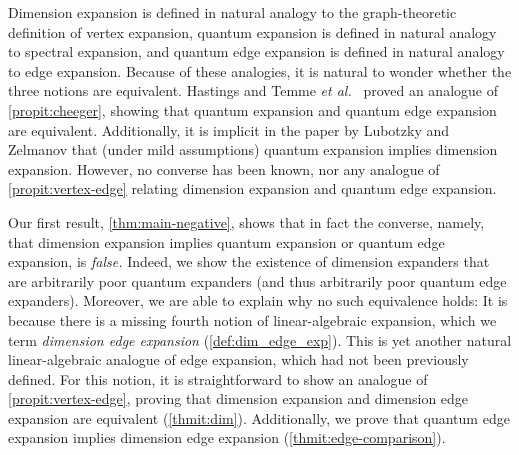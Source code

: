 \documentclass{toc}
\theoremstyle{plain}
\numberwithin{equation}{section}
\theoremstyle{definition}
\begin{document}
Dimension expansion is defined in natural analogy to the graph-theoretic definition of vertex expansion, quantum expansion is defined in natural analogy to spectral expansion, and quantum edge expansion is defined in natural analogy to edge expansion. Because of these analogies, it is natural to wonder whether the three notions are equivalent. Hastings \cite{PhysRevA.76.032315} and Temme \emph{et al.}~\cite{10.1063/1.3511335} proved an analogue of \cref{propit:cheeger}, showing that quantum expansion and quantum edge expansion are equivalent. Additionally, it is implicit in %
the paper by %
Lubotzky and Zelmanov \cite{LUBOTZKY2008730} that (under mild assumptions) quantum expansion implies dimension expansion. However, no %
converse  %
%
%
has been known,  %
nor any analogue of \cref{propit:vertex-edge} relating dimension expansion and 
quantum edge expansion.

%
%
%
%
%
Our first result,
\cref{thm:main-negative},   %
%
%
shows that in fact the %
converse,  %
namely,
that  %
dimension expansion implies quantum expansion or quantum edge expansion, is \emph{false.}
%
Indeed, we show the %
existence  %
of dimension expanders that are arbitrarily poor quantum expanders (and thus arbitrarily poor quantum edge expanders). Moreover, we are able to explain 
%
why 
%
no such equivalence holds: It is because there is a 
%
missing 
%
fourth notion of linear-algebraic expansion, which we term \emph{dimension edge expansion}
%
(\cref{def:dim_edge_exp}). 
%
This is yet another natural linear-algebraic analogue of edge expansion, which had not been previously defined. For this notion, it is straightforward to show an analogue of \cref{propit:vertex-edge}, proving that dimension expansion and dimension edge expansion are equivalent 
%
(\cref{thmit:dim}). 
%
Additionally, we prove that quantum edge expansion implies dimension edge expansion
%
(\cref{thmit:edge-comparison}). 
%
\end{document}
